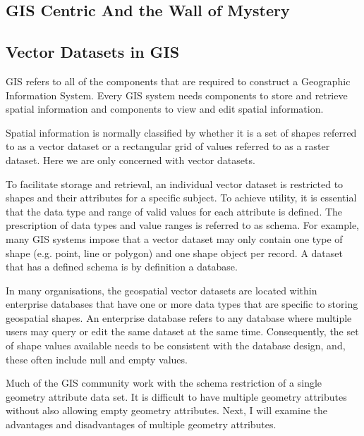 \documentclass[letterpaper,10pt,english]{sphinxmanual}
\begin{document}
\subsection{GIS Centric And the Wall of Mystery}
\label{\detokenize{concept:gis-centric-and-the-wall-of-mystery}}

\subsection{Vector Datasets in GIS}
\label{\detokenize{concept:vector-datasets-in-gis}}
GIS refers to all of the components that are required to construct a Geographic Information System.  Every GIS system
needs components to store and retrieve spatial information and components to view and edit spatial information.

Spatial information is normally classified by whether it is a set of shapes referred to as a vector dataset or a
rectangular grid of values referred to as a raster dataset.  Here we are only concerned with vector datasets.

To facilitate storage and retrieval, an individual vector dataset is restricted to shapes and their attributes for a
specific subject.  To achieve utility, it is essential that the data type and range of valid values for each attribute is defined.  The prescription of data types and value ranges is referred to as schema.   For example, many GIS systems impose that a vector dataset may only contain one type of shape (e.g. point, line or polygon) and one shape object per record.  A dataset that has a defined schema is by definition a database.

In many organisations, the geospatial vector datasets are located within enterprise databases that have one or more data types that are specific to storing geospatial shapes.  An enterprise database refers to any database where multiple users may query or edit the same dataset at the same time.  Consequently, the set of shape values available needs to be consistent with the database design, and, these often include null and empty values.

Much of the GIS community work with the schema  restriction of a single geometry attribute data set.  It is difficult
to have multiple geometry attributes without also allowing empty geometry attributes.  Next, I will examine the
advantages and disadvantages of multiple geometry attributes.
\end{document}
